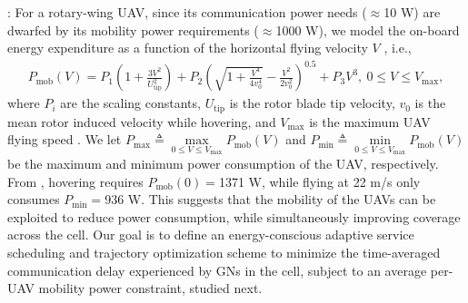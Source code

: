 \documentclass[12pt, draftcls, onecolumn]{IEEEtran}
\theoremstyle{plain}
\theoremstyle{definition}
\theoremstyle{remark}
\begin{document}
: For a rotary-wing UAV, since its communication power needs ($\approx$10 W) are dwarfed by its mobility power requirements ($\approx$1000 W), we model the on-board energy expenditure as a function of the horizontal flying velocity $V$ \cite{SCA}, i.e., 
\begin{align}\label{eq:Power}
    P_{\mathrm{mob}}(V) = P_{1}\left(1 + \frac{3 V^{2}}{U_{\mathrm{tip}}^{2}}\right) + P_{2}\left(\sqrt{1 + \frac{V^{4}}{4 v_{0}^{4}}} - \frac{V^{2}}{2 v_{0}^{2}}\right)^{0.5} + P_{3}V^{3},\ 0\leq V\leq V_{\max},
\end{align}
where $P_i$ are the scaling constants, $U_{\mathrm{tip}}$ is the rotor blade tip velocity, $v_{0}$ is the mean rotor induced velocity while hovering, and $V_{\max}$ is the maximum UAV flying speed \cite{SCA}.
We let $P_{\max}\triangleq \underset{0\leq V\leq V_{\max}}{\max}P_{\mathrm{mob}}(V)$ and $P_{\min}\triangleq \underset{0\leq V\leq V_{\max}}{\min}P_{\mathrm{mob}}(V)$ be the maximum and minimum power consumption of the UAV, respectively. From \cite{SCA}, hovering requires $P_{\mathrm{mob}}(0)=$1371 W, while flying at 22 m/s only consumes $P_{\min}=$936 W. This suggests that the mobility of the UAVs can be exploited to reduce power consumption, while simultaneously improving coverage across the cell. Our goal is to define an energy-conscious adaptive service scheduling and trajectory optimization scheme to minimize the time-averaged communication delay experienced by GNs in the cell, subject to an average per-UAV mobility power constraint, studied next.
\vspace{-4mm}
\end{document}
